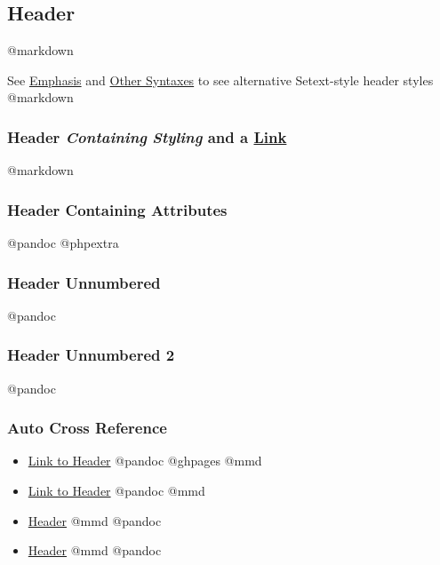 \documentclass[]{article}
\providecommand{\tightlist}{%
  \setlength{\itemsep}{0pt}\setlength{\parskip}{0pt}}
\begin{document}
\hypertarget{header}{\subsection{Header}\label{header}}

@markdown

See \protect\hyperlink{emphasis}{Emphasis} and
\protect\hyperlink{other-syntaxes}{Other Syntaxes} to see alternative
Setext-style header styles @markdown

\subsubsection{\texorpdfstring{Header \emph{Containing}
\textbf{\emph{Styling}} and a
\href{Https://www.wikipedia.org/}{Link}}{Header Containing Styling and a Link}}\label{header-containing-styling-and-a-link}

@markdown

\hypertarget{identifier}{\subsubsection{Header Containing
Attributes}\label{identifier}}

@pandoc @phpextra

\subsubsection*{Header Unnumbered}\label{header-unnumbered}

@pandoc

\subsubsection{Header Unnumbered 2}\label{header-unnumbered-2}

@pandoc

\subsubsection{Auto Cross Reference}\label{auto-cross-reference}

\begin{itemize}
\tightlist
\item
  \protect\hyperlink{header}{Link to Header} @pandoc @ghpages @mmd
\item
  \protect\hyperlink{header}{Link to Header} @pandoc @mmd
\item
  \protect\hyperlink{header}{Header} @mmd @pandoc
\item
  \protect\hyperlink{header}{Header} @mmd @pandoc
\end{itemize}
\end{document}

